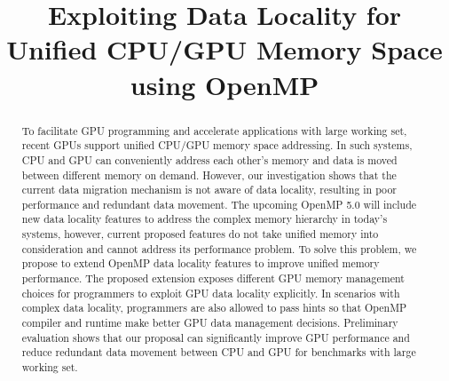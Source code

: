 \documentclass[sigconf]{acmart}
\begin{document}
\title{Exploiting Data Locality for Unified CPU/GPU Memory Space using OpenMP}




\begin{abstract}

To facilitate GPU programming and accelerate applications with large working set, recent GPUs support unified CPU/GPU memory space addressing.
In such systems, CPU and GPU can conveniently address each other's memory and data is moved between different memory on demand.
However, our investigation shows that the current data migration mechanism is not aware of data locality, resulting in poor performance and redundant data movement.
The upcoming OpenMP 5.0 will include new data locality features to address the complex memory hierarchy in today's systems, however, current proposed features do not take unified memory into consideration and cannot address its performance problem.
To solve this problem, we propose to extend OpenMP data locality features to improve unified memory performance.
The proposed extension exposes different GPU memory management choices for programmers to exploit GPU data locality explicitly.
In scenarios with complex data locality, programmers are also allowed to pass hints so that OpenMP compiler and runtime make better GPU data management decisions.
Preliminary evaluation shows that our proposal can significantly improve GPU performance and reduce redundant data movement between CPU and GPU for benchmarks with large working set.


\end{abstract}
\end{document}

